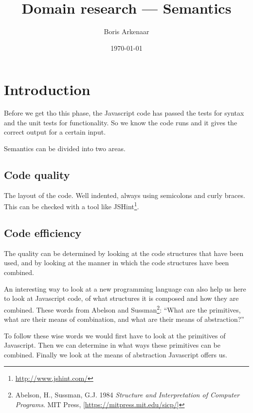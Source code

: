\documentclass{article}
\begin{document}
 

\title{Domain research --- Semantics}
\author{Boris Arkenaar}
\date{\today}
\maketitle 

\section{Introduction} 

Before we get tho this phase, the Javascript code has passed the tests for
syntax and the unit tests for functionality. So we know the code runs and it
gives the correct output for a certain input.

Semantics can be divided into two areas.

\subsection{Code quality}

The layout of the code. Well indented, always using semicolons and curly
braces. This can be checked with a tool like
JSHint\footnote{\url{http://www.jshint.com/}}.

\subsection{Code efficiency}

The quality can be determined by looking at the code structures that have been
used, and by looking at the manner in which the code structures have been
combined.

An interesting way to look at a new programming language can also help us here
to look at Javascript code, of what structures it is composed and how they are
combined. These words from Abelson and Sussman\footnote{Abelson, H., Sussman,
G.J. 1984 {\em Structure and Interpretation of Computer Programs}. MIT Press,
[\url{https://mitpress.mit.edu/sicp/}]}: ``What are the primitives, what are
their means of combination, and what are their means of abstraction?''

To follow these wise words we would first have to look at the primitives of Javascript. Then we can determine in what ways these primitives can be combined. Finally we look at the means of abstraction Javascript offers us.
\end{document}
